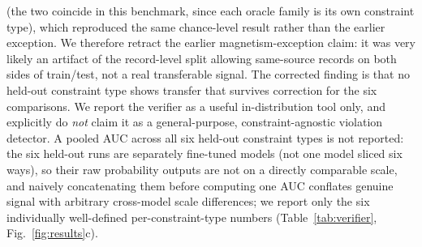 \documentclass[pdflatex,sn-nature]{sn-jnl}
\begin{document}
(the two coincide in this benchmark, since each oracle family is its own constraint type),
which reproduced the same chance-level result rather than the earlier exception. We
therefore retract the earlier magnetism-exception claim: it was very likely an artifact of
the record-level split allowing same-source records on both sides of train/test, not a
real transferable signal. The corrected finding is that no held-out constraint type shows
transfer that survives correction for the six comparisons. We report the verifier as a useful
in-distribution tool only, and explicitly do \emph{not} claim it as a general-purpose,
constraint-agnostic violation detector. A pooled AUC across all six held-out constraint
types is not reported: the six held-out runs are separately fine-tuned models (not one
model sliced six ways), so their raw probability outputs are not on a directly comparable
scale, and naively concatenating them before computing one AUC conflates genuine signal
with arbitrary cross-model scale differences; we report only the six individually
well-defined per-constraint-type numbers (Table~\ref{tab:verifier}, Fig.~\ref{fig:results}c).
\end{document}
